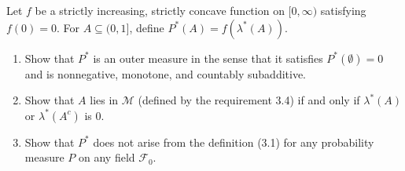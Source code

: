 \documentclass[11pt]{article}
\newcommand{\F}{\mathcal{F}}
\newcommand{\seq}{\subseteq}
\newcommand{\es}{\emptyset}
\newcommand{\mc}{\mathcal}
\newenvironment{exercise}[2][Exercise]{\begin{trivlist}
\item[\hskip \labelsep {\bfseries #1}\hskip \labelsep {\bfseries #2.}]}{\end{trivlist}}
\begin{document}
\begin{exercise}{3.4}
    Let $f$ be a strictly increasing, strictly concave function on $[0, \infty)$ satisfying $f(0) = 0$. For $A \seq (0, 1]$, define $P^{\ast} (A) = f(\lambda^{\ast} (A))$. 
    \begin{enumerate}
        \item Show that $P^{\ast}$ is an outer measure in the sense that it satisfies $P^\ast (\es) = 0$ and is nonnegative, monotone, and countably subadditive.
        \item Show that $A$ lies in $\mc{M}$ (defined by the requirement 3.4) if and only if $\lambda^{\ast} (A)$ or $\lambda^\ast (A^c)$ is $0$. 
        \item Show that $P^\ast$ does not arise from the definition (3.1) for any probability measure $P$ on any field $\F_0$.
    \end{enumerate}
\end{exercise}
\end{document}
